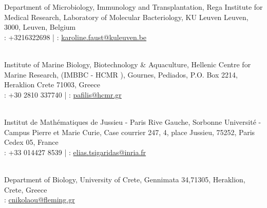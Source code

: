 \documentclass[
	a4paper,
]{fortysecondscv}
\begin{document}
\begin{cvtable}


	    {Department of Microbiology, Immunology and Transplantation, Rega Institute for Medical Research, Laboratory of Molecular Bacteriology, KU Leuven
	    Leuven, 3000, Leuven, Belgium
	    \\ 
	    \faPhone: +3216322698 | 
	    \faAt: \href{mailto:karoline.faust@kuleuven.be}{karoline.faust@kuleuven.be}}
	  
	\\ 


	    {Institute of Marine Biology, Biotechnology \& Aquaculture, Hellenic Centre for Marine Research, (IMBBC - HCMR
	    ),
	    Gournes, Pediados, P.O. Box 2214, Heraklion Crete 71003, Greece \\ \faPhone: +30 2810 337740 | 
	    \faAt: \href{mailto:pafilis@hcmr.gr}{pafilis@hcmr.gr}}
	    
	\\
	  
	  

    
	    {Institut de Mathématiques de Jussieu - Paris Rive Gauche, Sorbonne Université - Campus Pierre et Marie Curie, Case courrier 247, 4, place Jussieu, 75252, Paris Cedex 05, France \\ 
	    \faPhone: +33 014427 8539 | \faAt: \href{mailto: elias.tsigaridas@inria.fr}{elias.tsigaridas@inria.fr}}

    \\

	    {Department of Biology, University of Crete, Gennimata 34,71305, Heraklion, Crete, Greece \\ 
	    \faAt: \href{mailto:cnikolaou@fleming.gr}{cnikolaou@fleming.gr}}


\end{cvtable}





\end{document}
